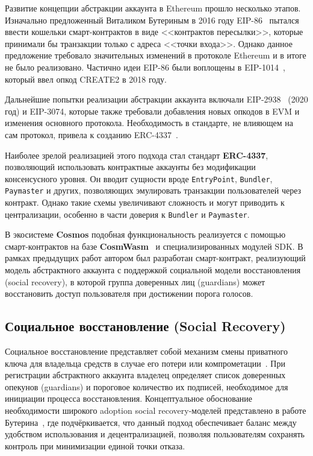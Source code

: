 Развитие концепции абстракции аккаунта в Ethereum прошло несколько этапов. Изначально предложенный Виталиком Бутериным в 2016 году EIP-86~\cite{s2} пытался ввести кошельки смарт-контрактов в виде <<контрактов пересылки>>, которые принимали бы транзакции только с адреса <<точки входа>>. Однако данное предложение требовало значительных изменений в протоколе Ethereum и в итоге не было реализовано. Частично идеи EIP-86 были воплощены в EIP-1014~\cite{s3}, который ввел опкод CREATE2 в 2018 году.

Дальнейшие попытки реализации абстракции аккаунта включали EIP-2938~\cite{s4} (2020 год) и EIP-3074, которые также требовали добавления новых опкодов в EVM и изменения основного протокола. Необходимость в стандарте, не влияющем на сам протокол, привела к созданию ERC-4337~\cite{s5}.

Наиболее зрелой реализацией этого подхода стал стандарт \textbf{ERC-4337}, позволяющий использовать контрактные аккаунты без модификации консенсусного уровня. Он вводит сущности вроде \texttt{EntryPoint}, \texttt{Bundler}, \texttt{Paymaster} и других, позволяющих эмулировать транзакции пользователей через контракт. Однако такие схемы увеличивают сложность и могут приводить к централизации, особенно в части доверия к \texttt{Bundler} и \texttt{Paymaster}.

В экосистеме \textbf{Cosmos} подобная функциональность реализуется с помощью смарт-контрактов на базе \textbf{CosmWasm}~\cite{s6} и специализированных модулей SDK. В рамках предыдущих работ автором был разработан смарт-контракт, реализующий модель абстрактного аккаунта с поддержкой социальной модели восстановления (social recovery), в которой группа доверенных лиц (guardians) может восстановить доступ пользователя при достижении порога голосов.

\subsection{Социальное восстановление (Social Recovery)}

Социальное восстановление представляет собой механизм смены приватного ключа для владельца средств в случае его потери или компрометации~\cite{s7,s8}. При регистрации абстрактного аккаунта владелец определяет список доверенных опекунов (guardians) и пороговое количество их подписей, необходимое для инициации процесса восстановления. Концептуальное обоснование необходимости широкого adoption social recovery-моделей представлено в работе Бутерина~\cite{s9}, где подчёркивается, что данный подход обеспечивает баланс между удобством использования и децентрализацией, позволяя пользователям сохранять контроль при минимизации единой точки отказа.

